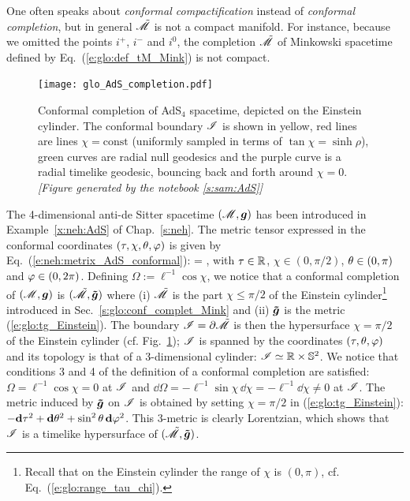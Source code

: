 \begin{remark}
One often speaks about
\emph{conformal compactification}
instead of \emph{conformal completion}, but in general $\tilde{\mathscr{M}}$ is not a
compact manifold. For instance, because we omitted the points $i^+$, $i^-$ and $i^0$,
the completion $\tilde{\mathscr{M}}$ of Minkowski spacetime defined by Eq.~(\ref{e:glo:def_tM_Mink})
is not compact.
\end{remark}

\begin{figure}
\centerline{\texttt{[image: glo\_AdS\_completion.pdf]}}
\caption[]{\label{f:glo:AdS_completion} \footnotesize
Conformal completion of AdS$_{4}$ spacetime, depicted on the Einstein cylinder.
The conformal boundary $\mathscr{I}$ is shown in yellow, red lines are lines
$\chi=\mathrm{const}$ (uniformly sampled in terms of $\tan\chi = \sinh\rho$),
green curves are radial null geodesics and the purple curve
is a radial timelike geodesic, bouncing back and forth around $\chi=0$.
\textsl{[Figure generated by the notebook \ref{s:sam:AdS}]}
}
\end{figure}

\begin{example} \label{x:glo:AdS}
The 4-dimensional anti-de Sitter spacetime
$(\mathscr{M},\bm{g})$
has been introduced in Example~\ref{x:neh:AdS} of Chap.~\ref{s:neh}.
The metric tensor expressed in the conformal coordinates
$(\tau,\chi,\theta,\varphi)$ is given by Eq.~(\ref{e:neh:metrix_AdS_conformal}):
\be
     =   ,
\ee
with $\tau\in\mathbb{R}$, $\chi \in (0,\pi/2)$, $\theta\in(0,\pi)$ and $\varphi\in(0,2\pi)$.
Defining $\Omega := \ell^{-1}\cos\chi$, we notice that
a conformal completion of $(\mathscr{M},\bm{g})$ is $(\tilde{\mathscr{M}},\bm{\tilde{g}})$
where (i) $\tilde{\mathscr{M}}$ is the part $\chi \leq \pi/2$ of the Einstein cylinder\footnote{Recall that on the
Einstein cylinder the range of $\chi$ is $(0,\pi)$, cf. Eq.~(\ref{e:glo:range_tau_chi}).}
introduced in Sec.~\ref{s:glo:conf_complet_Mink}
and (ii)  $\bm{\tilde{g}}$ is the metric (\ref{e:glo:tg_Einstein}).
The boundary $\mathscr{I} = \partial\tilde{\mathscr{M}}$ is then the hypersurface $\chi=\pi/2$
of the Einstein cylinder (cf. Fig.~\ref{f:glo:AdS_completion});
$\mathscr{I}$ is spanned by the coordinates $(\tau,\theta,\varphi)$
and its topology is that of a 3-dimensional cylinder: $\mathscr{I} \simeq \mathbb{R}\times\mathbb{S}^2$.
We notice that conditions 3 and 4 of the definition of a conformal completion
are satisfied: $\Omega = \ell^{-1} \cos\chi = 0$ at $\mathscr{I}$ and
$\dd\Omega = - \ell^{-1} \sin\chi\, \dd\chi = -\ell^{-1} \dd\chi \not = 0 $
at $\mathscr{I}$.
The metric induced by $\bm{\tilde{g}}$ on $\mathscr{I}$ is obtained by
setting $\chi=\pi/2$ in (\ref{e:glo:tg_Einstein}):
$- \mathbf{d} \tau^2 + \mathbf{d}\theta^2 + \sin^2\theta \, \mathbf{d}\varphi^2$.
This 3-metric is clearly Lorentzian, which shows that $\mathscr{I}$ is a timelike
hypersurface of $(\tilde{\mathscr{M}},\bm{\tilde{g}})$.
\end{example}

